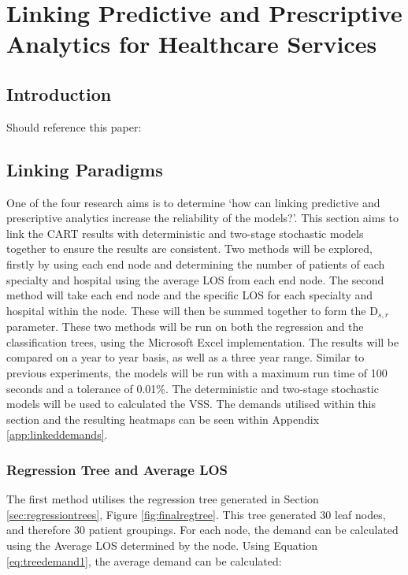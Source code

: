 \documentclass[../thesis.tex]{subfiles}
\begin{document}
\chapter{Linking Predictive and Prescriptive Analytics for Healthcare Services}

\section{Introduction}
Should reference this paper: 

\section{Linking Paradigms}\label{sec:linking}
One of the four research aims is to determine `how can linking predictive and prescriptive analytics increase the reliability of the models?'. This section aims to link the CART results with deterministic and two-stage stochastic models together to ensure the results are consistent. Two methods will be explored, firstly by using each end node and determining the number of patients of each specialty and hospital using the average LOS from each end node. The second method will take each end node and the specific LOS for each specialty and hospital within the node. These will then be summed together to form the D$_{s,r}$ parameter. These two methods will be run on both the regression and the classification trees, using the Microsoft Excel implementation. The results will be compared on a year to year basis, as well as a three year range. Similar to previous experiments, the models will be run with a maximum run time of 100 seconds and a tolerance of 0.01\%. The deterministic and two-stage stochastic models will be used to calculated the VSS. The demands utilised within this section and the resulting heatmaps can be seen within Appendix \ref{app:linkeddemands}.

\subsection{Regression Tree and Average LOS}
The first method utilises the regression tree generated in Section \ref{sec:regressiontrees}, Figure \ref{fig:finalregtree}. This tree generated 30 leaf nodes, and therefore 30 patient groupings. For each node, the demand can be calculated using the Average LOS determined by the node. Using Equation \eqref{eq:treedemand1}, the average demand can be calculated:
\end{document}
